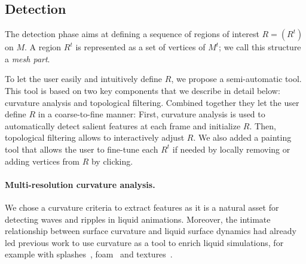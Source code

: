 \subsection{Detection}\label{sec:features:detection}

The detection phase aims at defining a sequence of regions of interest $R = (R^t)$ on $M$.
A region $R^t$ is represented as a set of vertices of $M^t$; we call this structure a \emph{mesh part}. 

To let the user easily and intuitively define $R$, we propose a semi-automatic tool.
This tool is based on two key components that we describe in detail below: 
curvature analysis and topological filtering.
Combined together they let the user define $R$ in a coarse-to-fine manner: 
First, curvature analysis is used to automatically detect salient features at each frame and initialize $R$. 
Then, topological filtering allows to interactively adjust $R$. 
We also added a painting tool that allows the user to fine-tune each $R^t$ if needed by locally removing or adding vertices from $R$ by clicking.

\paragraph*{Multi-resolution curvature analysis.}
We chose a curvature criteria to extract features as it is a natural asset for detecting waves and ripples in liquid animations. Moreover, the intimate relationship between surface curvature and liquid surface dynamics had already led previous work to use curvature as a tool to enrich liquid simulations, for example with splashes~\cite{Takahashi2003}, foam~\cite{Ihmsen2012} and textures~\cite{Narain2007}.

